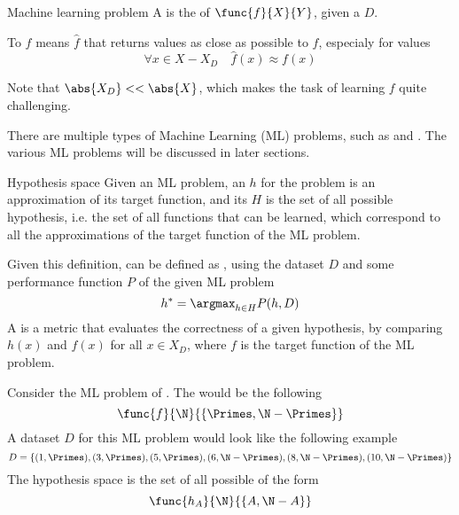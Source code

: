 \documentclass[a4paper, 12pt]{report}
\begin{document}
    \begin{frameddefn}{Machine learning problem}
        A  is the  of  $\func{f}{X}{Y}$, given a  $D$.

        To  $f$ means  $\hat f$ that returns values as close as possible to $f$, especialy for values  $$\forall x \in  X - X_D \quad \hat f(x) \approx f(x)$$
    \end{frameddefn}

    Note that $\abs{X_D} << \abs{X}$, which makes the task of learning $f$ quite challenging.

    There are multiple types of Machine Learning (ML) problems, such as  and . The various ML problems will be discussed in later sections.

    \begin{frameddefn}{Hypothesis space}
        Given an ML problem, an  $h$ for the problem is an approximation of its target function, and its  $H$ is the set of all possible hypothesis, i.e. the set of all functions that can be learned, which correspond to all the approximations of the target function of the ML problem.
    \end{frameddefn}

    Given this definition,  can be defined as , using the dataset $D$ and some performance function $P$ of the given ML problem $$h^* = \argmax_{h \in H}{P(h, D)}$$ A  is a metric that evaluates the correctness of a given hypothesis, by comparing $h(x)$ and $f(x)$ for all $x \in X_D$, where $f$ is the target function of the ML problem.

    \begin{example}[Hypothesis]
        Consider the ML problem of . The  would be the following $$\func{f}{\N}{\{\Primes, \N - \Primes\}}$$ A dataset $D$ for this ML problem would look like the following example $$D = \{(1, \Primes), (3, \Primes), (5, \Primes), (6, \N - \Primes), (8, \N - \Primes), (10, \N - \Primes)\}$$ The hypothesis space is the set of all possible  of the form $$\func{h_A}{\N}{\{A, \N - A\}}$$
    \end{example}
\end{document}
